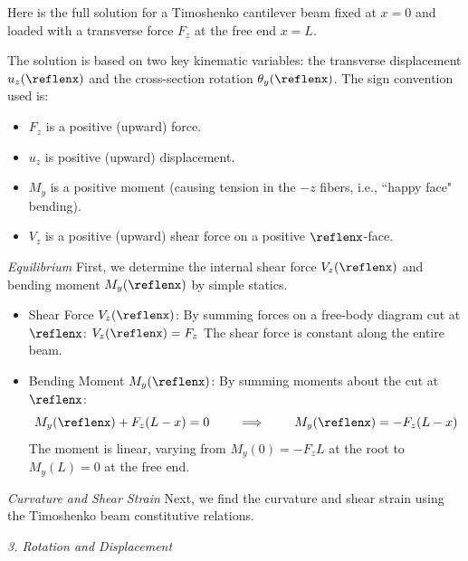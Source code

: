 
Here is the full solution for a Timoshenko cantilever beam fixed at $x=0$ and loaded with a transverse force $F_z$ at the free end $x=L$.

The solution is based on two key kinematic variables: the transverse displacement $u_z(\reflenx)$ and the cross-section rotation $\theta_y(\reflenx)$. 
The sign convention used is:
\begin{itemize}
\item $F_z$ is a positive (upward) force.
\item $u_z$ is positive (upward) displacement.
\item $M_y$ is a positive moment (causing tension in the $-z$ fibers, i.e., ``happy face" bending).
\item $V_z$ is a positive (upward) shear force on a positive $\reflenx$-face.
\end{itemize}

\textit{Equilibrium}
First, we determine the internal shear force $V_z(\reflenx)$ and bending moment $M_y(\reflenx)$ by simple statics.

\begin{itemize}
\item
Shear Force $V_z(\reflenx)$:
    By summing forces on a free-body diagram cut at \(\reflenx\):
    $V_z(\reflenx) = F_z$
    The shear force is constant along the entire beam.
\item
Bending Moment $M_y(\reflenx)$:
    By summing moments about the cut at \(\reflenx\):
    \[M_y(\reflenx) + F_z(L-x) = 0
    \qquad\implies\qquad
    M_y(\reflenx) = -F_z(L-x)
    \]
    The moment is linear, varying from $M_y(0) = -F_z L$ at the root to $M_y(L) = 0$ at the free end.
\end{itemize}

\textit{Curvature and Shear Strain}
Next, we find the curvature and shear strain using the Timoshenko beam constitutive relations.



\textit{3. Rotation and Displacement}

